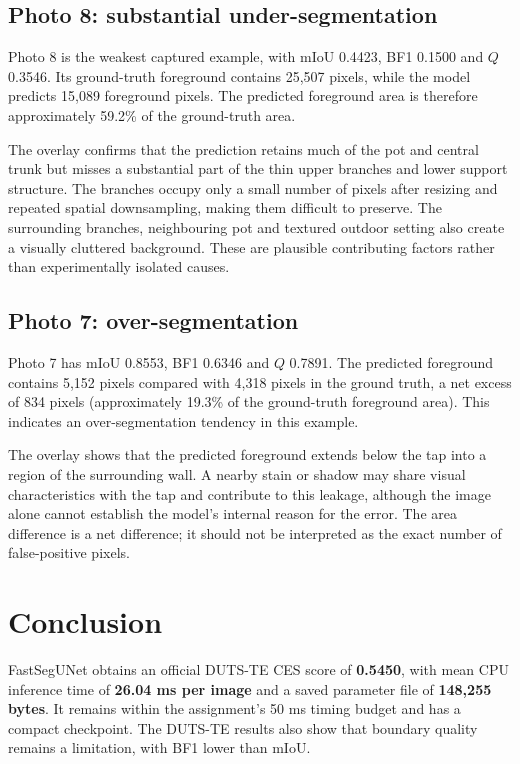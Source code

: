 \documentclass[10pt,a4paper]{article}
\begin{document}
\subsection{Photo 8: substantial under-segmentation}

Photo 8 is the weakest captured example, with mIoU 0.4423, BF1 0.1500 and $Q$ 0.3546. Its ground-truth foreground contains 25,507 pixels, while the model predicts 15,089 foreground pixels. The predicted foreground area is therefore approximately 59.2\% of the ground-truth area.

The overlay confirms that the prediction retains much of the pot and central trunk but misses a substantial part of the thin upper branches and lower support structure. The branches occupy only a small number of pixels after resizing and repeated spatial downsampling, making them difficult to preserve. The surrounding branches, neighbouring pot and textured outdoor setting also create a visually cluttered background. These are plausible contributing factors rather than experimentally isolated causes.

\subsection{Photo 7: over-segmentation}

Photo 7 has mIoU 0.8553, BF1 0.6346 and $Q$ 0.7891. The predicted foreground contains 5,152 pixels compared with 4,318 pixels in the ground truth, a net excess of 834 pixels (approximately 19.3\% of the ground-truth foreground area). This indicates an over-segmentation tendency in this example.

The overlay shows that the predicted foreground extends below the tap into a region of the surrounding wall. A nearby stain or shadow may share visual characteristics with the tap and contribute to this leakage, although the image alone cannot establish the model's internal reason for the error. The area difference is a net difference; it should not be interpreted as the exact number of false-positive pixels.

\section{Conclusion}

FastSegUNet obtains an official DUTS-TE CES score of \textbf{0.5450}, with mean CPU inference time of \textbf{26.04 ms per image} and a saved parameter file of \textbf{148,255 bytes}. It remains within the assignment's 50 ms timing budget and has a compact checkpoint. The DUTS-TE results also show that boundary quality remains a limitation, with BF1 lower than mIoU.
\end{document}
